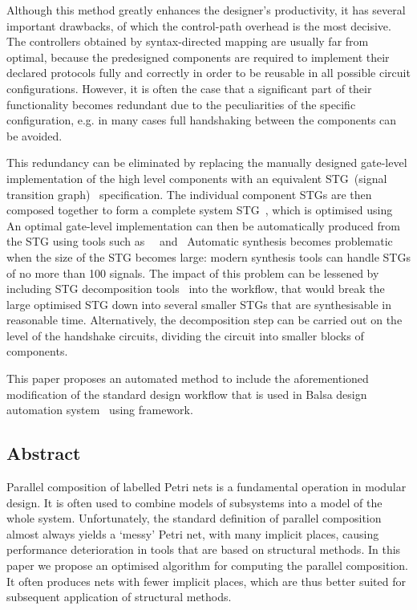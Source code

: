 Although this method greatly enhances the designer's productivity,
it has several important drawbacks, of which the control-path overhead
is the most decisive. The controllers obtained by syntax-directed
mapping are usually far from optimal, because the predesigned components
are required to implement their declared protocols fully and correctly
in order to be reusable in all possible circuit configurations. However,
it is often the case that a significant part of their functionality
becomes redundant due to the peculiarities of the specific configuration,
e.g. in many cases full handshaking between the components can be
avoided.

This redundancy can be eliminated by replacing the manually designed
gate-level implementation of the high level components with an equivalent
STG~(signal transition graph)~\cite{Yakovlev_1998_cs} specification.
The individual component STGs are then composed together to form a
complete system STG~\cite{785214}, which is optimised using \cite{cortadella_petrify}
An optimal gate-level implementation can then be automatically produced
from the STG using tools such as ~~\cite{Sentovich:M92/41}\noun{ }and~\cite{Khomenko_2004_MPSAT}
Automatic synthesis becomes problematic when the size of the STG becomes
large: modern synthesis tools can handle STGs of no more than 100
signals. The impact of this problem can be lessened by including STG
decomposition tools~\cite{DesiJ} into the workflow, that would break
the large optimised STG down into several smaller STGs that are synthesisable
in reasonable time. Alternatively, the decomposition step can be carried
out on the level of the handshake circuits, dividing the circuit into
smaller blocks of components.

This paper proposes an automated method to include the aforementioned
modification of the standard design workflow that is used in Balsa
design automation system~\cite{balsa} using framework.

\subsection{Abstract}
Parallel composition of labelled Petri nets is a fundamental operation in modular design. It is often used to combine models of subsystems into a model of the whole system.
Unfortunately, the standard definition of parallel composition almost always yields a `messy' Petri net, with many implicit places, causing performance deterioration in tools that are based on structural methods. In this paper we propose an optimised algorithm for computing the parallel composition. It often produces nets with fewer implicit places, which are thus better suited for subsequent application of structural methods.

